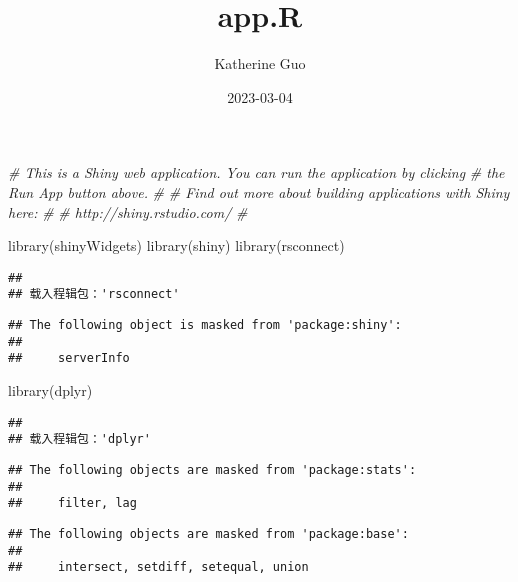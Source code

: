 \documentclass[
]{article}
\title{app.R}
\author{Katherine Guo}
\date{2023-03-04}
\newenvironment{Shaded}{\begin{snugshade}}{\end{snugshade}}
\newcommand{\CommentTok}[1]{\textcolor[rgb]{0.56,0.35,0.01}{\textit{#1}}}
\newcommand{\FunctionTok}[1]{\textcolor[rgb]{0.00,0.00,0.00}{#1}}
\newcommand{\NormalTok}[1]{#1}
\begin{document}
\maketitle

\begin{Shaded}
\begin{Highlighting}[]
\CommentTok{\# This is a Shiny web application. You can run the application by clicking}
\CommentTok{\# the \textquotesingle{}Run App\textquotesingle{} button above.}
\CommentTok{\#}
\CommentTok{\# Find out more about building applications with Shiny here:}
\CommentTok{\#}
\CommentTok{\#    http://shiny.rstudio.com/}
\CommentTok{\#}

\FunctionTok{library}\NormalTok{(shinyWidgets)}
\FunctionTok{library}\NormalTok{(shiny)}
\FunctionTok{library}\NormalTok{(rsconnect)}
\end{Highlighting}
\end{Shaded}

\begin{verbatim}
## 
## 载入程辑包：'rsconnect'
\end{verbatim}

\begin{verbatim}
## The following object is masked from 'package:shiny':
## 
##     serverInfo
\end{verbatim}

\begin{Shaded}
\begin{Highlighting}[]
\FunctionTok{library}\NormalTok{(dplyr)}
\end{Highlighting}
\end{Shaded}

\begin{verbatim}
## 
## 载入程辑包：'dplyr'
\end{verbatim}

\begin{verbatim}
## The following objects are masked from 'package:stats':
## 
##     filter, lag
\end{verbatim}

\begin{verbatim}
## The following objects are masked from 'package:base':
## 
##     intersect, setdiff, setequal, union
\end{verbatim}
\end{document}
